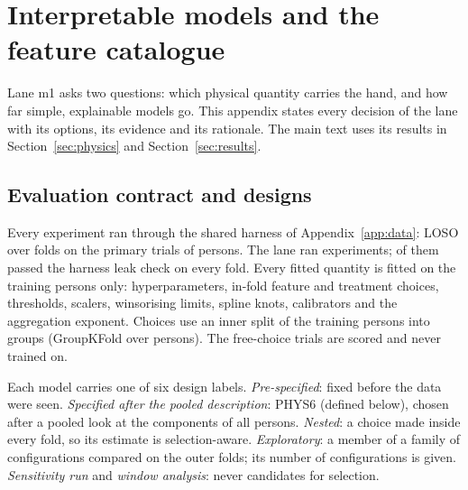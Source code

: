 \section{Interpretable models and the feature catalogue}\label{app:m1}

Lane m1 asks two questions: which physical quantity carries the hand, and how far simple, explainable
models go. This appendix states every decision of the lane with its options, its evidence and its
rationale. The main text uses its results in Section~\ref{sec:physics} and Section~\ref{sec:results}.

\subsection{Evaluation contract and designs}\label{app:m1:contract}

Every experiment ran through the shared harness of Appendix~\ref{app:data}: LOSO over 
folds on the  primary trials of  persons. The lane ran
 experiments;  of them passed the harness leak check on
every fold. Every fitted quantity is fitted on the training persons only: hyperparameters, in-fold
feature and treatment choices, thresholds, scalers, winsorising limits, spline knots, calibrators and
the aggregation exponent. Choices use an inner split of the training persons into groups
(GroupKFold over persons). The free-choice trials are scored and never trained on.

Each model carries one of six design labels. \emph{Pre-specified}: fixed before the data were seen.
\emph{Specified after the pooled description}: PHYS6 (defined below), chosen after a pooled look at the
components of all persons. \emph{Nested}: a choice made inside every fold, so its estimate is
selection-aware. \emph{Exploratory}: a member of a family of configurations compared on the outer
folds; its number of configurations is given. \emph{Sensitivity run} and \emph{window analysis}: never
candidates for selection.


